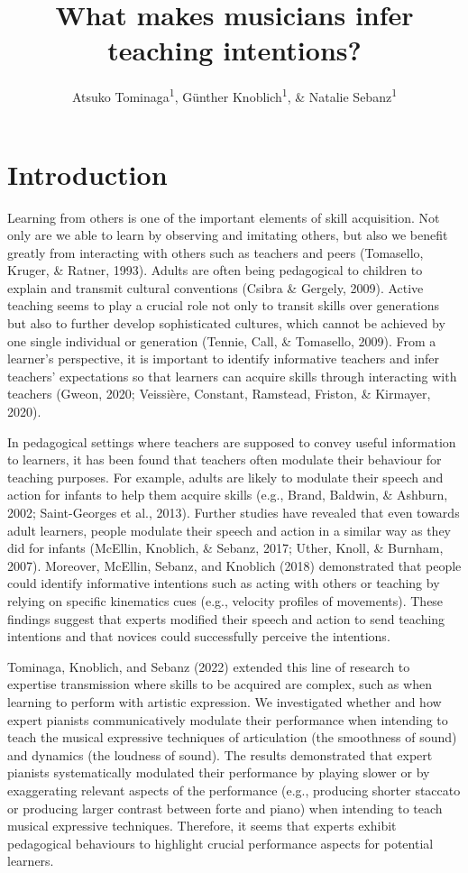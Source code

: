 \documentclass[
  man,floatsintext]{apa6}
\title{What makes musicians infer teaching intentions?}
\author{Atsuko Tominaga\textsuperscript{1}, Günther Knoblich\textsuperscript{1}, \& Natalie Sebanz\textsuperscript{1}}
\date{}
\affiliation{\vspace{0.5cm}\textsuperscript{1} Department of Cognitive Science, Central European University, Quellenstraße 51, 1100 Vienna, Austria}
\begin{document}
\maketitle

\hypertarget{introduction}{%
\section{Introduction}\label{introduction}}

Learning from others is one of the important elements of skill acquisition. Not only are we able to learn by observing and imitating others, but also we benefit greatly from interacting with others such as teachers and peers (Tomasello, Kruger, \& Ratner, 1993). Adults are often being pedagogical to children to explain and transmit cultural conventions (Csibra \& Gergely, 2009). Active teaching seems to play a crucial role not only to transit skills over generations but also to further develop sophisticated cultures, which cannot be achieved by one single individual or generation (Tennie, Call, \& Tomasello, 2009). From a learner's perspective, it is important to identify informative teachers and infer teachers' expectations so that learners can acquire skills through interacting with teachers (Gweon, 2020; Veissière, Constant, Ramstead, Friston, \& Kirmayer, 2020).

In pedagogical settings where teachers are supposed to convey useful information to learners, it has been found that teachers often modulate their behaviour for teaching purposes. For example, adults are likely to modulate their speech and action for infants to help them acquire skills (e.g., Brand, Baldwin, \& Ashburn, 2002; Saint-Georges et al., 2013). Further studies have revealed that even towards adult learners, people modulate their speech and action in a similar way as they did for infants (McEllin, Knoblich, \& Sebanz, 2017; Uther, Knoll, \& Burnham, 2007). Moreover, McEllin, Sebanz, and Knoblich (2018) demonstrated that people could identify informative intentions such as acting with others or teaching by relying on specific kinematics cues (e.g., velocity profiles of movements). These findings suggest that experts modified their speech and action to send teaching intentions and that novices could successfully perceive the intentions.

Tominaga, Knoblich, and Sebanz (2022) extended this line of research to expertise transmission where skills to be acquired are complex, such as when learning to perform with artistic expression. We investigated whether and how expert pianists communicatively modulate their performance when intending to teach the musical expressive techniques of articulation (the smoothness of sound) and dynamics (the loudness of sound). The results demonstrated that expert pianists systematically modulated their performance by playing slower or by exaggerating relevant aspects of the performance (e.g., producing shorter staccato or producing larger contrast between forte and piano) when intending to teach musical expressive techniques. Therefore, it seems that experts exhibit pedagogical behaviours to highlight crucial performance aspects for potential learners.
\end{document}
